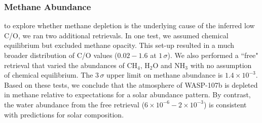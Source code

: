\documentclass[twocolumn, trackchanges]{aastex61}
\begin{document}
\subsubsection{Methane Abundance}
 to explore whether methane depletion is the underlying cause of the inferred low C/O, we ran two additional retrievals.  In one test, we assumed chemical equilibrium but excluded methane opacity. This set-up resulted in a much broader distribution of C/O values ($0.02 - 1.6$ at $1\,\sigma$).  We also performed a ``free" retrieval that varied the abundances of CH$_4$, H$_2$O and NH$_3$ with no assumption of chemical equilibrium. The $3\,\sigma$ upper limit on methane abundance is $1.4\times10^{-3}$.  Based on these tests, we conclude that the atmosphere of WASP-107b is  depleted in methane relative to expectations for a solar abundance pattern. By contrast, the water abundance from the free retrieval ($6\times10^{-6} - 2\times10^{-3}$) is consistent with predictions for solar composition. 
	

\end{document}
